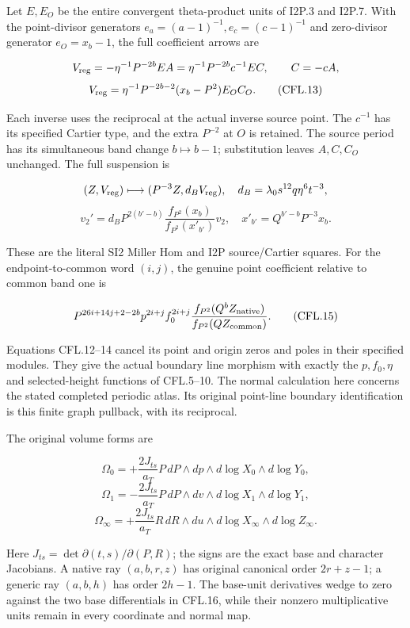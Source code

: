 Let \(E,E_O\) be the entire convergent theta-product units of
I2P.3 and I2P.7. With the point-divisor generators
\(e_a=(a-1)^{-1},e_c=(c-1)^{-1}\) and zero-divisor generator
\(e_O=x_b-1\), the full coefficient arrows are

\[
 V_{\rm reg}=-\eta^{-1}P^{-2b}EA
       =\eta^{-1}P^{-2b}c^{-1}EC,\qquad C=-cA,
\]
\[
 V_{\rm reg}=
       \eta^{-1}P^{-2b-2}(x_b-P^2)E_OC_O.
 \tag{CFL.13}
\]

Each inverse uses the reciprocal at the actual inverse source
point. The \(c^{-1}\) has its specified Cartier type, and
the extra \(P^{-2}\) at \(O\) is retained. The source period
has its simultaneous band change \(b\mapsto b-1\); substitution
leaves \(A,C,C_O\) unchanged. The full suspension is

\[
 (Z,V_{\rm reg})\longmapsto(P^{-3}Z,d_BV_{\rm reg}),
 \quad d_B=\lambda_0s^{12}q\eta^6t^{-3},
\]
\[
 v_2'=d_BP^{2(b'-b)}
       \frac{f_{P^2}(x_b)}{f_{P^2}(x'_{b'})}v_2,
 \quad x'_{b'}=Q^{b'-b}P^{-3}x_b.
 \tag{CFL.14}
\]

These are the literal SI2 Miller Hom and I2P source/Cartier
squares. For the endpoint-to-common word \((i,j)\), the
genuine point coefficient relative to common band one is

\[
 P^{26i+14j+2-2b}p^{2i+j}f_0^{2i+j}
 \frac{f_{P^2}(Q^bZ_{\rm native})}
      {f_{P^2}(QZ_{\rm common})}.
 \tag{CFL.15}
\]

Equations CFL.12--14 cancel its point and origin zeros and
poles in their specified modules. They give the actual
boundary line morphism with exactly the \(p,f_0,\eta\) and
selected-height functions of CFL.5--10. The normal calculation
here concerns the stated completed periodic atlas. Its
original point-line boundary identification is this finite
graph pullback, with its reciprocal.

The original volume forms are

\[
 \Omega_0=+\frac{2J_{ts}}{a_T}
       P\,dP\wedge dp\wedge d\log X_0\wedge d\log Y_0,
\]
\[
 \Omega_1=-\frac{2J_{ts}}{a_T}
       P\,dP\wedge dv\wedge d\log X_1\wedge d\log Y_1,
\]
\[
 \Omega_\infty=+\frac{2J_{ts}}{a_T}
       R\,dR\wedge du\wedge d\log X_\infty\wedge d\log Z_\infty.
 \tag{CFL.16}
\]

Here \(J_{ts}=\det\partial(t,s)/\partial(P,R)\); the signs
are the exact base and character Jacobians. A native ray
\((a,b,r,z)\) has original canonical order \(2r+z-1\);
a generic ray \((a,b,h)\) has order \(2h-1\).
The base-unit derivatives wedge to zero against the two
base differentials in CFL.16, while their nonzero
multiplicative units remain in every coordinate and normal map.

